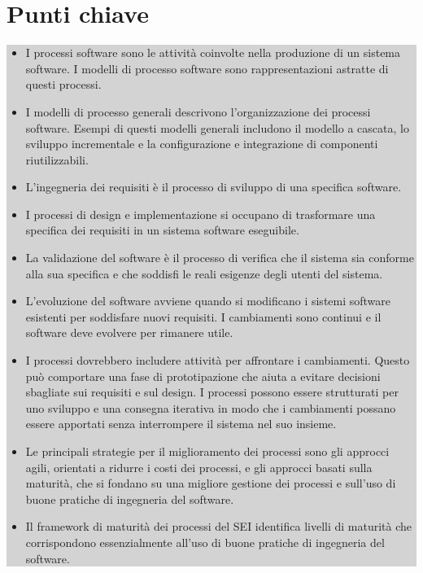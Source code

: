 \section{Punti chiave}
\begin{center}
\begin{minipage}{\textwidth}
\colorbox{lightgray}{
\parbox{\linewidth}{
\begin{itemize} 
    \item I processi software sono le attività coinvolte nella produzione di un sistema software. I modelli di processo software sono rappresentazioni astratte di questi processi.
    \item I modelli di processo generali descrivono l'organizzazione dei processi software. Esempi di questi modelli generali includono il modello a cascata, lo sviluppo incrementale e la configurazione e integrazione di componenti riutilizzabili.
    \item L'ingegneria dei requisiti è il processo di sviluppo di una specifica software.
    \item I processi di design e implementazione si occupano di trasformare una specifica dei requisiti in un sistema software eseguibile.
    \item La validazione del software è il processo di verifica che il sistema sia conforme alla sua specifica e che soddisfi le reali esigenze degli utenti del sistema.
    \item L'evoluzione del software avviene quando si modificano i sistemi software esistenti per soddisfare nuovi requisiti. I cambiamenti sono continui e il software deve evolvere per rimanere utile.
    \item I processi dovrebbero includere attività per affrontare i cambiamenti. Questo può comportare una fase di prototipazione che aiuta a evitare decisioni sbagliate sui requisiti e sul design. I processi possono essere strutturati per uno sviluppo e una consegna iterativa in modo che i cambiamenti possano essere apportati senza interrompere il sistema nel suo insieme.
    \item Le principali strategie per il miglioramento dei processi sono gli approcci agili, orientati a ridurre i costi dei processi, e gli approcci basati sulla maturità, che si fondano su una migliore gestione dei processi e sull'uso di buone pratiche di ingegneria del software.
    \item Il framework di maturità dei processi del SEI identifica livelli di maturità che corrispondono essenzialmente all'uso di buone pratiche di ingegneria del software.
\end{itemize}
}}
\end{minipage}
\end{center}